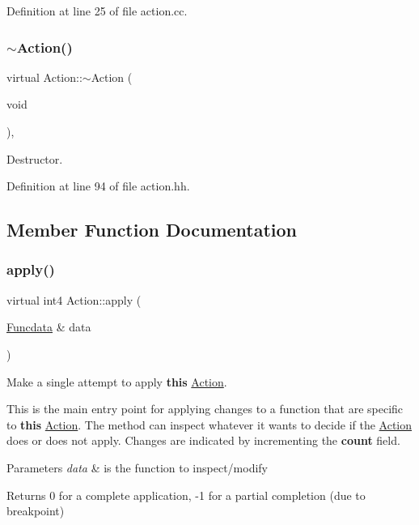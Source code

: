 Definition at line 25 of file action.\+cc.

\mbox{\label{class_action_a96ce796816ff45b892efe6820196fbf0}} 
\subsubsection{\texorpdfstring{$\sim$Action()}{~Action()}}
{\footnotesize\ttfamily virtual Action\+::$\sim$\+Action (\begin{DoxyParamCaption}\item[{void}]{ }\end{DoxyParamCaption})\hspace{0.3cm}{\ttfamily [inline]}, {\ttfamily [virtual]}}



Destructor. 



Definition at line 94 of file action.\+hh.



\subsection{Member Function Documentation}
\mbox{\label{class_action_aac1c3999d6c685b15f5d9765a4d04173}} 
\subsubsection{\texorpdfstring{apply()}{apply()}}
{\footnotesize\ttfamily virtual int4 Action\+::apply (\begin{DoxyParamCaption}\item[{\mbox{\hyperlink{class_funcdata}{Funcdata}} \&}]{data }\end{DoxyParamCaption})\hspace{0.3cm}{\ttfamily [pure virtual]}}



Make a single attempt to apply {\bfseries{this}} \mbox{\hyperlink{class_action}{Action}}. 

This is the main entry point for applying changes to a function that are specific to {\bfseries{this}} \mbox{\hyperlink{class_action}{Action}}. The method can inspect whatever it wants to decide if the \mbox{\hyperlink{class_action}{Action}} does or does not apply. Changes are indicated by incrementing the {\bfseries{count}} field. 
\begin{DoxyParams}{Parameters}
{\em data} & is the function to inspect/modify \\
\hline
\end{DoxyParams}
\begin{DoxyReturn}{Returns}
0 for a complete application, -\/1 for a partial completion (due to breakpoint) 
\end{DoxyReturn}


